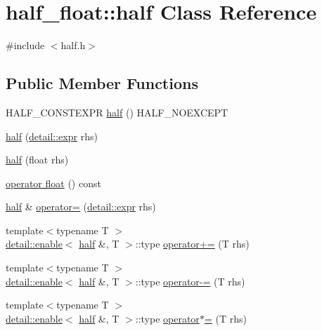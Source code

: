 \hypertarget{classhalf__float_1_1half}{}\section{half\+\_\+float\+:\+:half Class Reference}
\label{classhalf__float_1_1half}


{\ttfamily \#include $<$half.\+h$>$}

\subsection*{Public Member Functions}
\begin{DoxyCompactItemize}
\item 
H\+A\+L\+F\+\_\+\+C\+O\+N\+S\+T\+E\+X\+PR \hyperlink{classhalf__float_1_1half_a3f52e869fec499d6b86f2afc90749d6a}{half} () H\+A\+L\+F\+\_\+\+N\+O\+E\+X\+C\+E\+PT
\item 
\hyperlink{classhalf__float_1_1half_ab56421622ebddd86fc75ad1eebdfbd8e}{half} (\hyperlink{structhalf__float_1_1detail_1_1expr}{detail\+::expr} rhs)
\item 
\hyperlink{classhalf__float_1_1half_aad7fddc333853c6a37016e2eac3d4d04}{half} (float rhs)
\item 
\hyperlink{classhalf__float_1_1half_ae5ae15604c4f4343e696c11c83acf1d6}{operator float} () const 
\item 
\hyperlink{classhalf__float_1_1half}{half} \& \hyperlink{classhalf__float_1_1half_ada563d2964479ed1a325eca97933dc9f}{operator=} (\hyperlink{structhalf__float_1_1detail_1_1expr}{detail\+::expr} rhs)
\item 
{\footnotesize template$<$typename T $>$ }\\\hyperlink{structhalf__float_1_1detail_1_1enable}{detail\+::enable}$<$ \hyperlink{classhalf__float_1_1half}{half} \&, T $>$\+::type \hyperlink{classhalf__float_1_1half_aa562db3abdbf9c0bca4150f7cfa6bd1b}{operator+=} (T rhs)
\item 
{\footnotesize template$<$typename T $>$ }\\\hyperlink{structhalf__float_1_1detail_1_1enable}{detail\+::enable}$<$ \hyperlink{classhalf__float_1_1half}{half} \&, T $>$\+::type \hyperlink{classhalf__float_1_1half_a86647595e63e3d0bac1c4b17a3fe162e}{operator-\/=} (T rhs)
\item 
{\footnotesize template$<$typename T $>$ }\\\hyperlink{structhalf__float_1_1detail_1_1enable}{detail\+::enable}$<$ \hyperlink{classhalf__float_1_1half}{half} \&, T $>$\+::type \hyperlink{classhalf__float_1_1half_a6de077e98651981a899b09738e49d3c3}{operator$\ast$=} (T rhs)

\end{DoxyCompactItemize}
